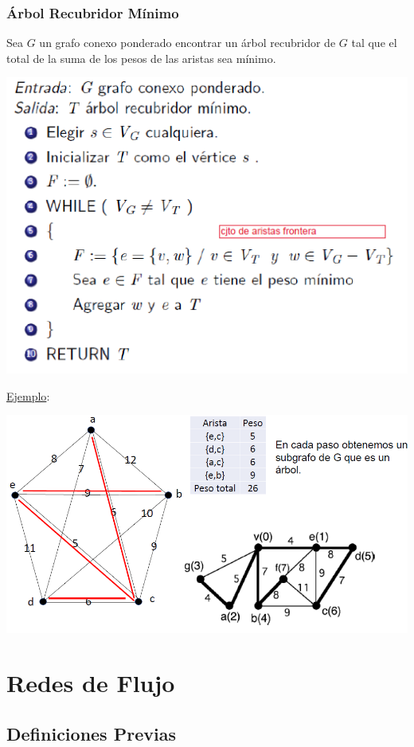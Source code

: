 \documentclass{article}
\begin{document}
\subsubsection{Árbol Recubridor Mínimo}
Sea $G$ un grafo conexo ponderado encontrar un árbol recubridor de $G$ tal que el total de la suma de los pesos de las aristas sea mínimo.
    \begin{center}
        \includegraphics[width=.80\textwidth]{algPRIM.PNG}
    \end{center}
\underline{Ejemplo}:
    \begin{center}
        \includegraphics[width=.60\textwidth]{primEj.PNG}
    \end{center}

\newpage
\section{Redes de Flujo}
\subsection{Definiciones Previas}
\end{document}
